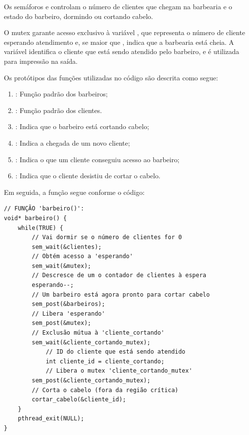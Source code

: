 \documentclass[
	12pt,				%
	openright,			%
	oneside,			%
	a4paper,			%
	chapter=TITLE,		%
	english,			%
	french,				%
	spanish,			%
	brazil				%
	]{abntex2}
\theoremstyle{definition}
\begin{document}
Os semáforos  e  controlam o número de clientes que chegam na barbearia e o estado do barbeiro, dormindo ou cortando cabelo.

O mutex  garante acesso exclusivo à variável , que representa o número de cliente esperando atendimento e, se maior que , indica que a barbearia está cheia. A variável  identifica o cliente que está sendo atendido pelo barbeiro, e é utilizada para impressão na saída.

Os protótipos das funções utilizadas no código são descrita como segue:

\begin{enumerate}
    \item {}: Função padrão dos barbeiros;
    \item {}: Função padrão dos clientes.
    \item {}: Indica que o barbeiro está cortando cabelo;
    \item {}: Indica a chegada de um novo cliente;
    \item {}: Indica o que um cliente conseguiu acesso ao barbeiro;
    \item {}: Indica que o cliente desistiu de cortar o cabelo.
\end{enumerate}

Em seguida, a função  segue conforme o código:

\begin{verbatim}
// FUNÇÃO 'barbeiro()':
void* barbeiro() {
    while(TRUE) {
        // Vai dormir se o número de clientes for 0 
        sem_wait(&clientes);
        // Obtém acesso a 'esperando' 
        sem_wait(&mutex); 
        // Descresce de um o contador de clientes à espera
        esperando--; 
        // Um barbeiro está agora pronto para cortar cabelo 
        sem_post(&barbeiros);
        // Libera 'esperando' 
        sem_post(&mutex);
        // Exclusão mútua à 'cliente_cortando'
        sem_wait(&cliente_cortando_mutex); 
            // ID do cliente que está sendo atendido
            int cliente_id = cliente_cortando;
            // Libera o mutex 'cliente_cortando_mutex'
        sem_post(&cliente_cortando_mutex); 
        // Corta o cabelo (fora da região crítica) 
        cortar_cabelo(&cliente_id);
    }
    pthread_exit(NULL);
}
\end{verbatim}
\end{document}
